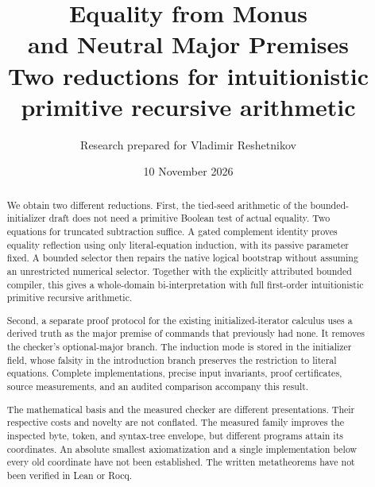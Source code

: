 \documentclass[11pt,letterpaper]{article}
\title{\color{ink}\bfseries Equality from Monus\\and Neutral Major Premises\\[8pt]
\large Two reductions for intuitionistic primitive recursive arithmetic}
\author{Research prepared for Vladimir Reshetnikov}
\date{10 November 2026}
\theoremstyle{definition}\newtheorem{definition}[theorem]{Definition}
\theoremstyle{remark}\newtheorem{remark}[theorem]{Remark}
\begin{document}
\maketitle
\begin{abstract}
We obtain two different reductions. First, the tied-seed arithmetic of the
bounded-initializer draft does not need a primitive Boolean test of actual
equality. Two equations for truncated subtraction suffice. A gated
complement identity proves equality reflection using only literal-equation
induction, with its passive parameter fixed. A bounded selector then
repairs the native logical bootstrap without assuming an unrestricted
numerical selector. Together with the explicitly attributed bounded
compiler, this gives a whole-domain bi-interpretation with full first-order
intuitionistic primitive recursive arithmetic.

Second, a separate proof protocol for the existing initialized-iterator
calculus uses a derived truth as the major premise of commands that
previously had none. It removes the checker's optional-major branch.
The induction mode is stored in the initializer field, whose falsity in
the introduction branch preserves the restriction to literal equations.
Complete implementations, precise input invariants, proof certificates,
source measurements, and an audited comparison accompany this result.

The mathematical basis and the measured checker are different
presentations. Their respective costs and novelty are not conflated.
The measured family improves the inspected byte, token, and syntax-tree
envelope, but different programs attain its coordinates. An absolute
smallest axiomatization and a single implementation below every old
coordinate have not been established. The written metatheorems have not
been verified in Lean or Rocq.
\end{abstract}
\begin{center}
\end{center}
\clearpage
\setcounter{tocdepth}{1}
\begingroup\small\setlength{\parskip}{0pt}\tableofcontents\endgroup
\clearpage








\clearpage\appendix


\clearpage
\end{document}
